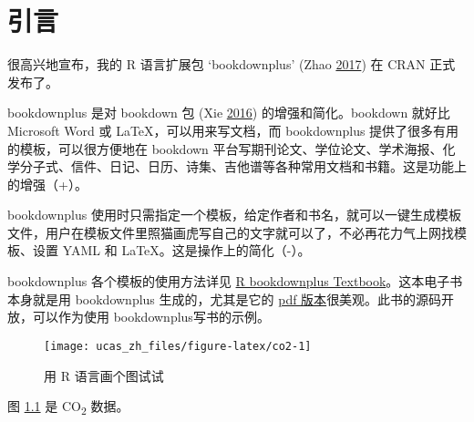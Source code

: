 \documentclass[singlesided]{Style/ucasthesis}%
\begin{document}



{%
\linespread{1.2}%
\tableofcontents%
\listoffigures%
\listoftables%
}

\setcounter{page}{1}
\mainmatter%
\mainmatter

\hypertarget{section}{%
\chapter{引言}\label{section}}

很高兴地宣布，我的 R 语言扩展包 `bookdownplus' (Zhao \protect\hyperlink{ref-R-bookdownplus}{2017}) 在 CRAN 正式发布了。

bookdownplus 是对 bookdown 包 (Xie \protect\hyperlink{ref-R-bookdown}{2016}) 的增强和简化。bookdown 就好比 Microsoft Word 或 LaTeX，可以用来写文档，而 bookdownplus 提供了很多有用的模板，可以很方便地在 bookdown 平台写期刊论文、学位论文、学术海报、化学分子式、信件、日记、日历、诗集、吉他谱等各种常用文档和书籍。这是功能上的增强（+）。

bookdownplus 使用时只需指定一个模板，给定作者和书名，就可以一键生成模板文件，用户在模板文件里照猫画虎写自己的文字就可以了，不必再花力气上网找模板、设置 YAML 和 LaTeX。这是操作上的简化（-）。

bookdownplus 各个模板的使用方法详见 \href{https://bookdown.org/baydap/bookdownplus}{R bookdownplus Textbook}。这本电子书本身就是用 bookdownplus 生成的，尤其是它的 \href{https://bookdown.org/baydap/bookdownplus/bookdownplus.pdf}{pdf 版本}很美观。此书的源码开放，可以作为使用 bookdownplus写书的示例。

\begin{figure}

{\centering \texttt{[image: ucas\_zh\_files/figure-latex/co2-1]} 

}

\caption{用 R 语言画个图试试}\label{fig:co2}
\end{figure}

图 \ref{fig:co2} 是 CO\textsubscript{2} 数据。
\end{document}
